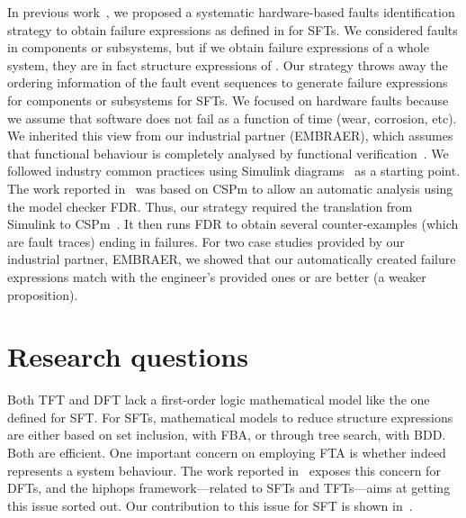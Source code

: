 \documentclass[12pt,openright,twoside,a4paper,oldfontcommands,english,brazil,final]{abntex2}
\theoremstyle{theo}
\newcommand{\EMBRAER}{EMBRAER\xspace}
\newcommand{\simulink}{Simulink\xspace}
\begin{document}
In previous work~\cite{Didier2012,DM2012}, we proposed a systematic hardware-based faults identification strategy to obtain failure expressions as defined in  for \acp{SFT}.
%
We considered faults in components or subsystems, but if we obtain failure expressions of a whole system, they are in fact structure expressions of .
%
Our strategy throws away the ordering information of the fault event sequences to generate failure expressions for components or subsystems for \acp{SFT}.
%
%
We focused on hardware faults because we assume that software does not fail as a function of time (wear, corrosion, etc).
%
We inherited this view from our industrial partner (\EMBRAER), which assumes that functional behaviour is completely analysed by functional verification~\cite{SP2011}.
%
We followed industry common practices using \simulink diagrams~\cite{Nise1992} as a starting point.
%
The work reported in~\cite{DM2012} was based on \ac{CSPm} to allow an automatic analysis using the model checker \acs{FDR}.
%
Thus, our strategy required the translation from \simulink to \ac{CSPm}~\cite{JMS+2011}.
%
It then runs \acs{FDR} to obtain several counter-examples (which are fault traces) ending in failures.
%
For two case studies provided by our industrial partner, \EMBRAER, we showed that our automatically created failure expressions match with the engineer's provided ones or are better (a weaker proposition).

\section{Research questions}

Both \ac{TFT} and \ac{DFT} lack a first-order logic mathematical model like the one defined for \ac{SFT}.
For \acp{SFT}, mathematical models to reduce structure expressions are either based on set inclusion, with \ac{FBA}, or through tree search, with \ac{BDD}.
Both are efficient.
One important concern on employing \ac{FTA} is whether  indeed represents a system behaviour.
The work reported in~\cite{MCS+1999} exposes this concern for \acp{DFT}, and the \ac{hiphops} framework---related to \acp{SFT} and \acp{TFT}---aims at getting this issue sorted out.
Our contribution to this issue for \ac{SFT} is shown in~\cite{DM2012,Didier2012}.
\end{document}
